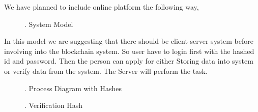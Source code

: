 \documentclass[a4paper,12pt]{report}
\begin{document}
We have planned to include online platform the following way,
\begin{figure}[!htb]
\caption{\label{fig:my-label}. System Model}
\end{figure}
In this model we are suggesting that there should be client-server system before involving into the blockchain system. So user have to login first with the hashed id and password. Then the person can apply for either Storing data into system or verify data from the system. The Server will perform the task.\\
\begin{figure}[!htb]
\caption{\label{fig:my-label}. Process Diagram with Hashes}
\end{figure}
\begin{figure}[!htb]
\caption{\label{fig:my-label}. Verification Hash}
\end{figure}
\end{document}
